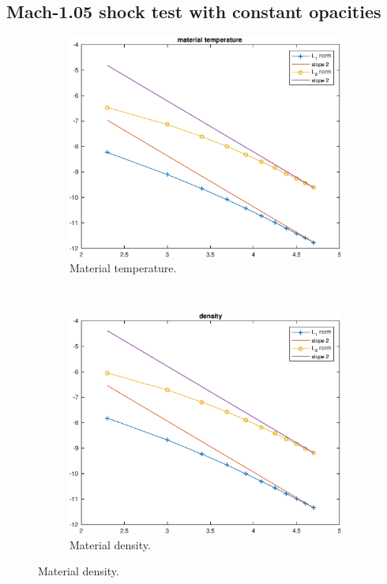 \documentclass[times,doublespace]{fldauth}%
\begin{document}
\subsection{Mach-1.05 shock test with constant opacities}\label{sec:mach-1p05-cst-xs}
%
\begin{figure}[H]
    \begin{subfigure}{0.5\textwidth}
    \centering
    \includegraphics[width=\linewidth]{figures/cst-xs/mach_1p05_material_temperature_spline.eps}
    \caption{Material temperature.}\label{fig:mach-1p05-cst-xs-temp}
    \end{subfigure}
    ~
    \begin{subfigure}{0.5\textwidth}
    \centering
    \includegraphics[width=\linewidth]{figures/cst-xs/mach_1p05_density_spline.eps}
    \caption{Material density.}\label{fig:mach-1p05-cst-xs-density}
    \end{subfigure}    
    

\end{figure}
\end{document}
